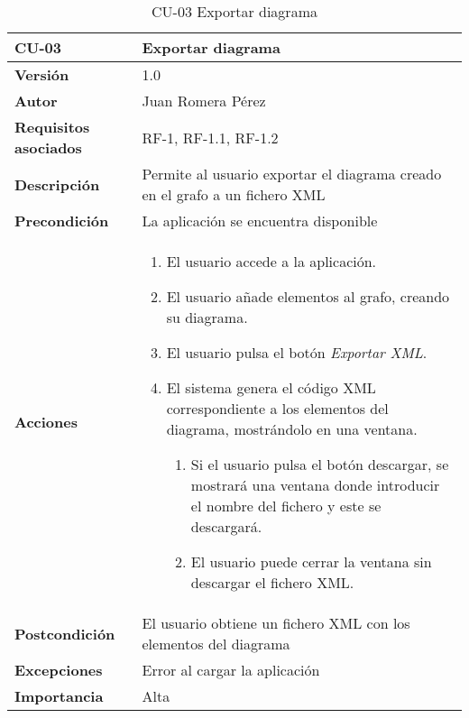 \begin{table}[p]
    \centering
    \begin{tabularx}{\linewidth}{ p{} p{}}
		\toprule
		\textbf{CU-03}    & \textbf{Exportar diagrama}\\
		\toprule
		\textbf{Versión}              & 1.0    \\
		\textbf{Autor}                & Juan Romera Pérez \\
		\textbf{Requisitos asociados} & RF-1, RF-1.1, RF-1.2 \\
		\textbf{Descripción}          & Permite al usuario exportar el diagrama creado en el grafo a un fichero XML \\
		\textbf{Precondición}         & La aplicación se encuentra disponible \\
		\textbf{Acciones}             &
		\begin{enumerate}
			\def\labelenumi{\arabic{enumi}.}
			\tightlist
			\item El usuario accede a la aplicación.
			\item El usuario añade elementos al grafo, creando su diagrama.
            \item El usuario pulsa el botón \emph{Exportar XML}.
            \item El sistema genera el código XML correspondiente a los elementos del diagrama, mostrándolo en una ventana.
            \begin{enumerate}
                \item Si el usuario pulsa el botón descargar, se mostrará una ventana donde introducir el nombre del fichero y este se descargará.
                \item El usuario puede cerrar la ventana sin descargar el fichero XML.
            \end{enumerate}
		\end{enumerate}\\
		\textbf{Postcondición}        & El usuario obtiene un fichero XML con los elementos del diagrama \\
		\textbf{Excepciones}          & Error al cargar la aplicación \\
		\textbf{Importancia}          & Alta \\
		\bottomrule
    \end{tabularx}
    \caption{CU-03 Exportar diagrama}
\end{table}

